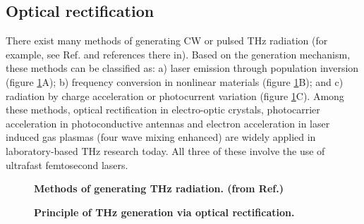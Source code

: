 \subsection{Optical rectification}

There exist many methods of generating CW or pulsed THz radiation (for example, see Ref.\@ \cite{LeeTHzbook2009,THzgenerationRev2007,THzgenerationRev2011} and references there in). Based on the generation mechanism, these methods can be classified as: a) laser emission through population inversion (figure \ref{fig:THzgeneration}A); b) frequency conversion in nonlinear materials (figure \ref{fig:THzgeneration}B); and c) radiation by charge acceleration or photocurrent variation (figure \ref{fig:THzgeneration}C). Among these methods, optical rectification in electro-optic crystals, photocarrier acceleration in photoconductive antennas and electron acceleration in laser induced gas plasmas (four wave mixing enhanced) are widely applied in laboratory-based THz research today. All three of these involve the use of ultrafast femtosecond lasers.

\begin{figure}[H]
	
	\centering
	\caption[Methods of generating THz radiation.]{{\bf Methods of generating THz radiation. (from Ref.\@ \cite{LeeTHzbook2009})}}
	\label{fig:THzgeneration}
	
\end{figure}

\begin{figure}[t!]
	
	\centering
	\hspace{-7mm}
	\caption[Principle of THz generation via optical rectification .]{{\bf Principle of THz generation via optical rectification.}}
	\label{fig:ORprinciple}
	
\end{figure}

